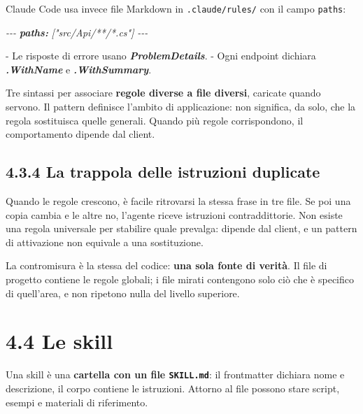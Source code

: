 \documentclass[
  italian,
  10pt,
]{book}
\newenvironment{Shaded}{\begin{snugshade}}{\end{snugshade}}
\newcommand{\AnnotationTok}[1]{\textcolor[rgb]{0.56,0.35,0.01}{\textbf{\textit{#1}}}}
\newcommand{\CommentTok}[1]{\textcolor[rgb]{0.56,0.35,0.01}{\textit{#1}}}
\newcommand{\InformationTok}[1]{\textcolor[rgb]{0.56,0.35,0.01}{\textbf{\textit{#1}}}}
\newcommand{\NormalTok}[1]{#1}
\newcommand{\SpecialStringTok}[1]{\textcolor[rgb]{0.31,0.60,0.02}{#1}}
\begin{document}
Claude Code usa invece file Markdown in \texttt{.claude/rules/} con il
campo \texttt{paths}:

\begin{Shaded}
\begin{Highlighting}[]
\CommentTok{{-}{-}{-}}
\AnnotationTok{paths:}\CommentTok{ ["src/Api/**/*.cs"]}
\CommentTok{{-}{-}{-}}

\SpecialStringTok{{-} }\NormalTok{Le risposte di errore usano }\InformationTok{\textasciigrave{}ProblemDetails\textasciigrave{}}\NormalTok{.}
\SpecialStringTok{{-} }\NormalTok{Ogni endpoint dichiara }\InformationTok{\textasciigrave{}.WithName\textasciigrave{}}\NormalTok{ e }\InformationTok{\textasciigrave{}.WithSummary\textasciigrave{}}\NormalTok{.}
\end{Highlighting}
\end{Shaded}

Tre sintassi per associare \textbf{regole diverse a file diversi},
caricate quando servono. Il pattern definisce l'ambito di applicazione:
non significa, da solo, che la regola sostituisca quelle generali.
Quando più regole corrispondono, il comportamento dipende dal client.

\subsection{4.3.4 La trappola delle istruzioni
duplicate}\label{la-trappola-delle-istruzioni-duplicate}

Quando le regole crescono, è facile ritrovarsi la stessa frase in tre
file. Se poi una copia cambia e le altre no, l'agente riceve istruzioni
contraddittorie. Non esiste una regola universale per stabilire quale
prevalga: dipende dal client, e un pattern di attivazione non equivale a
una sostituzione.

La contromisura è la stessa del codice: \textbf{una sola fonte di
verità}. Il file di progetto contiene le regole globali; i file mirati
contengono solo ciò che è specifico di quell'area, e non ripetono nulla
del livello superiore.

\section{4.4 Le skill}\label{le-skill}

Una skill è una \textbf{cartella con un file \texttt{SKILL.md}}: il
frontmatter dichiara nome e descrizione, il corpo contiene le
istruzioni. Attorno al file possono stare script, esempi e materiali di
riferimento.
\end{document}
